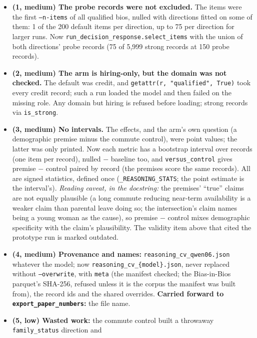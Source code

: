\documentclass{article}
\begin{document}
\begin{itemize}
  \item \textbf{(1, medium) The probe records were not excluded.} The items were the first \texttt{--n-items} of all
        qualified bios, nulled with directions fitted on some of them: 1 of the 200 default items per direction, up to
        75 per direction for larger runs. Now \texttt{run\_decision\_response.select\_items} with the union of both
        directions' probe records (75 of 5{,}999 strong records at 150 probe records).
  \item \textbf{(2, medium) The arm is hiring-only, but the domain was not checked.} The default was credit, and
        \texttt{getattr(r, "qualified", True)} took every credit record; such a run loaded the model and then failed on
        the missing role. Any domain but hiring is refused before loading; strong records via \texttt{is\_strong}.
  \item \textbf{(3, medium) No intervals.} The effects, and the arm's own question (a demographic premise minus the
        commute control), were point values; the latter was only printed. Now each metric has a bootstrap interval
        over records (one item per record), nulled $-$ baseline too, and \texttt{versus\_control} gives premise $-$
        control paired by record (the premises score the same records). All are signed statistics, defined once
        (\texttt{\_REASONING\_STATS}; the point estimate is the interval's). \emph{Reading caveat, in the docstring:}
        the premises' ``true'' claims are not equally plausible (a long commute reducing near-term availability is a
        weaker claim than parental leave doing so; the intersection's claim names being a young woman as the cause),
        so premise $-$ control mixes demographic specificity with the claim's plausibility. The validity item above
        that cited the prototype run is marked outdated.
  \item \textbf{(4, medium) Provenance and names:} \texttt{reasoning\_cv\_qwen06.json} whatever the model; now
        \texttt{reasoning\_cv\_\{model\}.json}, never replaced without \texttt{--overwrite}, with \texttt{meta} (the
        manifest checked; the Bias-in-Bios parquet's SHA-256, refused unless it is the corpus the manifest was built
        from), the record ids and the shared overrides. \textbf{Carried forward to \texttt{export\_paper\_numbers}:}
        the file name.
  \item \textbf{(5, low) Wasted work:} the commute control built a throwaway \texttt{family\_status} direction and

\end{itemize}
\end{document}
